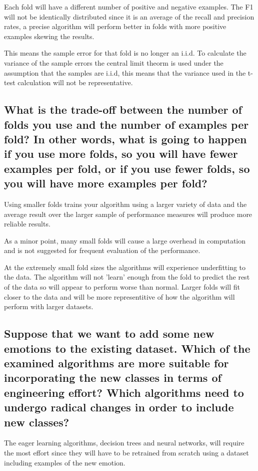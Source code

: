 \documentclass[11pt]{article}
\begin{document}
Each fold will have a different number of positive and negative examples. The F1 will not be identically distributed since it is an average of the recall and precision rates, a precise algorithm will perform better in folds with more positive examples skewing the results. 

This means the sample error for that fold is no longer an i.i.d. To calculate the variance of the sample errors the central limit theorm is used under the assumption that the samples are i.i.d, this means that the variance used in the t-test calculation will not be representative.

\subsection{What is the trade-off between the number of folds you use and the number of examples per fold? In other words, what is going to happen if you use more folds, so you will have fewer examples per fold, or if you use fewer folds, so you will have more examples per fold?}

Using smaller folds trains your algorithm using a larger variety of data and the average result over the larger sample of performance measures will produce more reliable results.

As a minor point, many small folds will cause a large overhead in computation and is not suggested for frequent evaluation of the performance. 

At the extremely small fold sizes the algorithms will experience underfitting to the data. The algorithm will not 'learn' enough from the fold to predict the rest of the data so will appear to perform worse than normal. Larger folds will fit closer to the data and will be more representitive of how the algorithm will perform with larger datasets. 

\subsection{Suppose that we want to add some new emotions to the existing dataset. Which of the examined algorithms are more suitable for incorporating the new classes in terms of engineering effort? Which algorithms need to undergo radical changes in order to include new classes?}

The eager learning algorithms, decision trees and neural networks, will require the most effort since they will have to be retrained from scratch using a dataset including examples of the new emotion. 
\end{document}
